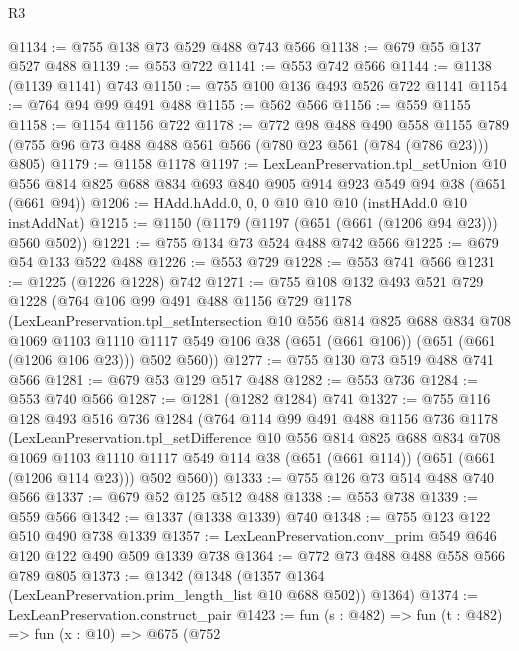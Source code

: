 \begin{lexlean}{R3}
\begin{coremodule}
{{{{{{{{{{{{{{{{@1134 := @755 @138 @73 @529 @488 @743 @566
@1138 := @679 @55 @137 @527 @488
@1139 := @553 @722
@1141 := @553 @742 @566
@1144 := @1138 (@1139 @1141) @743
@1150 := @755 @100 @136 @493 @526 @722 @1141
@1154 := @764 @94 @99 @491 @488
@1155 := @562 @566
@1156 := @559 @1155
@1158 := @1154 @1156 @722
@1178 := @772
    @98
    @488
    @490
    @558
    @1155
    @789
    (@755 @96 @73 @488 @488 @561 @566 (@780 @23 @561 (@784 (@786 @23))) @805)
@1179 := @1158 @1178
@1197 := LexLeanPreservation.tpl_setUnion
    @10
    @556
    @814
    @825
    @688
    @834
    @693
    @840
    @905
    @914
    @923
    @549
    @94
    @38
    (@651 (@661 @94))
@1206 := HAdd.hAdd.{0, 0, 0} @10 @10 @10 (instHAdd.{0} @10 instAddNat)
@1215 := @1150 (@1179 (@1197 (@651 (@661 (@1206 @94 @23))) @560 @502))
@1221 := @755 @134 @73 @524 @488 @742 @566
@1225 := @679 @54 @133 @522 @488
@1226 := @553 @729
@1228 := @553 @741 @566
@1231 := @1225 (@1226 @1228) @742
@1271 := @755
    @108
    @132
    @493
    @521
    @729
    @1228
    (@764
      @106
      @99
      @491
      @488
      @1156
      @729
      @1178
      (LexLeanPreservation.tpl_setIntersection
        @10
        @556
        @814
        @825
        @688
        @834
        @708
        @1069
        @1103
        @1110
        @1117
        @549
        @106
        @38
        (@651 (@661 @106))
        (@651 (@661 (@1206 @106 @23)))
        @502
        @560))
@1277 := @755 @130 @73 @519 @488 @741 @566
@1281 := @679 @53 @129 @517 @488
@1282 := @553 @736
@1284 := @553 @740 @566
@1287 := @1281 (@1282 @1284) @741
@1327 := @755
    @116
    @128
    @493
    @516
    @736
    @1284
    (@764
      @114
      @99
      @491
      @488
      @1156
      @736
      @1178
      (LexLeanPreservation.tpl_setDifference
        @10
        @556
        @814
        @825
        @688
        @834
        @708
        @1069
        @1103
        @1110
        @1117
        @549
        @114
        @38
        (@651 (@661 @114))
        (@651 (@661 (@1206 @114 @23)))
        @502
        @560))
@1333 := @755 @126 @73 @514 @488 @740 @566
@1337 := @679 @52 @125 @512 @488
@1338 := @553 @738
@1339 := @559 @566
@1342 := @1337 (@1338 @1339) @740
@1348 := @755 @123 @122 @510 @490 @738 @1339
@1357 := LexLeanPreservation.conv_prim @549 @646 @120 @122 @490 @509 @1339 @738
@1364 := @772 @73 @488 @488 @558 @566 @789 @805
@1373 := @1342 (@1348 (@1357 @1364 (LexLeanPreservation.prim_length_list @10 @688 @502)) @1364)
@1374 := LexLeanPreservation.construct_pair
@1423 := fun (s : @482) =>
  fun (t : @482) =>
  fun (x : @10) =>
  @675
    (@752
}}}}}}}}}}}}}}}}
\end{coremodule}
\end{lexlean}
